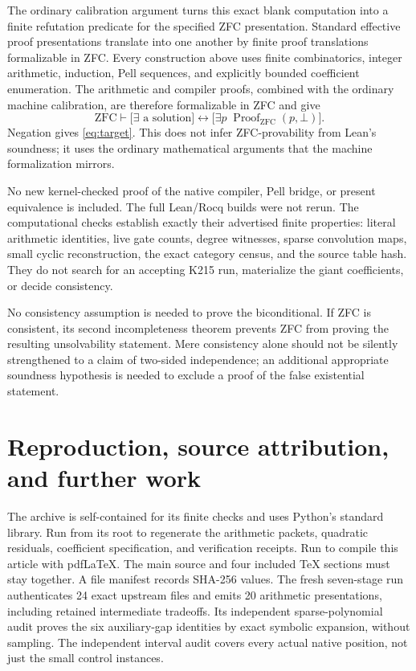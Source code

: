 \documentclass[11pt,a4paper]{article}
\theoremstyle{definition}\newtheorem{definition}[theorem]{Definition}
\theoremstyle{remark}\newtheorem{remark}[theorem]{Remark}
\newcommand{\code}[1]{\texttt{\detokenize{#1}}}
\begin{document}
The ordinary calibration argument turns this exact blank computation
into a finite refutation predicate for the specified ZFC presentation.
Standard effective proof presentations translate into one another by
finite proof translations formalizable in ZFC. Every construction above
uses finite combinatorics, integer arithmetic, induction, Pell sequences,
and explicitly bounded coefficient enumeration. The arithmetic and
compiler proofs, combined with the ordinary machine calibration,
are therefore formalizable in ZFC and give
\[
 \mathrm{ZFC}\vdash
 \bigl[\exists\text{ a solution}\bigr]
 \leftrightarrow
 \bigl[\exists p\;\operatorname{Proof}_{\mathrm{ZFC}}(p,\bot)\bigr].
\]
Negation gives \eqref{eq:target}. This does not infer ZFC-provability
from Lean's soundness; it uses the ordinary mathematical arguments
that the machine formalization mirrors.

No new kernel-checked proof of the native compiler, Pell bridge, or
present equivalence is included. The full Lean/Rocq builds were not
rerun. The computational checks establish exactly their advertised
finite properties: literal arithmetic identities, live gate counts,
degree witnesses, sparse convolution maps, small cyclic reconstruction,
the exact category census, and the source table hash. They do not
search for an accepting K215 run, materialize the giant coefficients,
or decide consistency.

No consistency assumption is needed to prove the biconditional. If
ZFC is consistent, its second incompleteness theorem prevents ZFC
from proving the resulting unsolvability statement. Mere consistency
alone should not be silently strengthened to a claim of two-sided
independence; an additional appropriate soundness hypothesis is needed
to exclude a proof of the false existential statement.

\section{Reproduction, source attribution, and further work}
\label{sec:reproduction}

The archive is self-contained for its finite checks and uses Python's
standard library. Run \code{python3 reproduce.py} from its root to
regenerate the arithmetic packets, quadratic residuals, coefficient
specification, and verification receipts. Run \code{make report} to
compile this article with pdfLaTeX. The main source and four included
TeX sections must stay together. A file manifest records SHA-256 values.
The fresh seven-stage run authenticates 24 exact upstream files and
emits 20 arithmetic presentations, including retained intermediate
tradeoffs. Its independent sparse-polynomial audit proves the six
auxiliary-gap identities by exact symbolic expansion, without sampling.
The independent interval audit covers every actual native position,
not just the small control instances.
\end{document}
